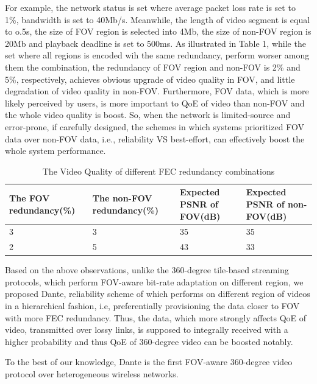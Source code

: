     For example, the network status is set where average packet loss rate is set to 1\%, bandwidth is set to 40Mb/s. Meanwhile, the length of video segment is equal to o.5s, the size of FOV region is selected into 4Mb, the size of non-FOV region is 20Mb and playback deadline is set to 500ms. As illustrated in Table 1, while the set where all regions is encoded wih the same redundancy, perform worser among them the combination, the redundancy of FOV region and non-FOV is 2\% and 5\%, respectively, achieves obvious upgrade of video quality in FOV, and little degradation of video quality in non-FOV. Furthermore, FOV data, which is more likely perceived by users, is more important to QoE of video than non-FOV and the whole video quality is boost. So, when the network is limited-source and error-prone, if carefully designed, the schemes in which systems prioritized FOV data over non-FOV data, i.e., reliability VS best-effort, can effectively boost the whole system performance.       
	
	\begin{table}
		\centering 
		\scriptsize
		\begin{tabular}{p{2.0cm}p{2.0cm}p{1.6cm}p{1.6cm}}
			\rowcolor[gray]{0.9} 
			\hline
			The FOV redundancy(\%) &The non-FOV redundancy(\%) & Expected PSNR of FOV(dB) & Expected PSNR of non-FOV(dB)\\
			\hline
			3  &  3  &  35  &  35\\    
			\hline
			2  &  5  &  43  &  33\\ 
			\hline
			
		\end{tabular}
		\caption{The Video Quality of different FEC redundancy combinations}
		\label{}
	\end{table}
	 
	 
	Based on the above observations, unlike the 360-degree tile-based streaming protocols, which perform FOV-aware bit-rate adaptation on different region, we proposed Dante, reliability scheme of which performs on different region of videos in a hierarchical fashion, i.e, preferentially provisioning the data closer to FOV with more FEC redundancy. Thus, the data, which more strongly affects QoE of video, transmitted over lossy links, is supposed to integrally received with a higher probability and thus QoE of 360-degree video can be boosted notably.
 
To the best of our knowledge, Dante is the first FOV-aware 360-degree video protocol over heterogeneous wireless networks.

